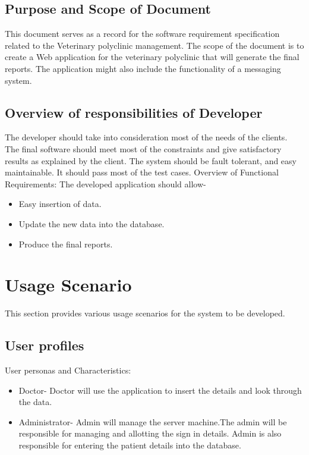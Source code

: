 \documentclass[oneside,a4paper,12pt]{book}
\begin{document}
\subsection{Purpose and Scope of Document}
This document serves as a record for the software requirement specification related to the Veterinary polyclinic management.  
The scope of the document is to create a Web application for the veterinary polyclinic that will generate the final reports.
The application might also include the functionality of a messaging system.  


\subsection{Overview of responsibilities of Developer}
The developer should take into consideration most of the needs of the clients. The final software should meet most of the constraints and give satisfactory results as explained by the client.  
The system should be fault tolerant, and easy maintainable. It should pass most of the test cases.  
Overview of Functional Requirements: The developed application should allow-
\begin{itemize}
\item Easy insertion of data.
\item Update the new data into the database.
\item Produce the final reports. 
\end{itemize}
 

  
\section{Usage Scenario}
This section provides various usage scenarios for the system to be developed.  
 \subsection{User profiles}  
User personas and Characteristics:
\begin{itemize}
\item Doctor- Doctor will use the application to insert the details and look through the data.  
\item Administrator- Admin will manage the server machine.The admin will be responsible for managing and allotting the sign in details. Admin is also responsible for entering the patient details into the database.
\end{itemize}
\end{document}
